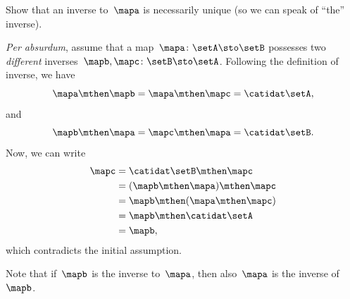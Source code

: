 \begin{exercise}\label{ex:uniqueness-of-inverse-function}
    Show that an inverse to~$\mapa$ is necessarily unique (so we can speak of ``the'' inverse).
\end{exercise}

\begin{solution}
    \emph{Per absurdum}, assume that a map~$\mapa\colon \setA \sto \setB$ possesses two \emph{different} inverses~$\mapb,\mapc\colon \setB \sto \setA$.
    Following the definition of inverse, we have
    \begin{equation}
        \mapa \mthen \mapb=\mapa \mthen \mapc=\catidat\setA,
    \end{equation}
    and
    \begin{equation}
        \mapb \mthen \mapa=\mapc \mthen \mapa=\catidat\setB.
    \end{equation}
    Now, we can write
    \begin{equation}
        \begin{aligned}
            \mapc & =\catidat\setB \mthen \mapc \\
                  & =(\mapb \mthen \mapa)\mthen \mapc \\
                  & =\mapb\mthen (\mapa \mthen \mapc) \\
                  & =\mapb \mthen \catidat\setA \\
                  & =\mapb,
        \end{aligned}
    \end{equation}
    which contradicts the initial assumption.
\end{solution}

\begin{remark}
    Note that if~$\mapb$ is the inverse to~$\mapa$, then also~$\mapa$ is the inverse of~$\mapb$.
\end{remark}


